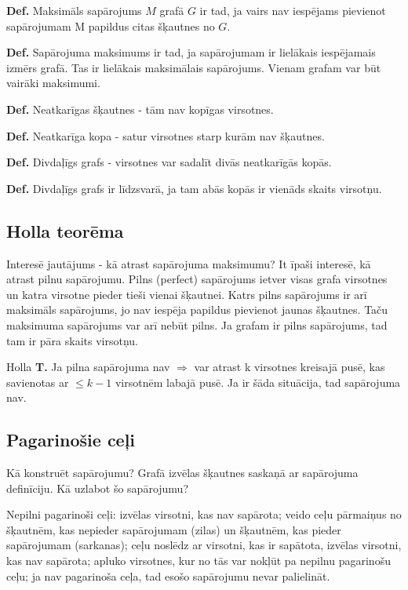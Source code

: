 \documentclass{article}
\begin{document}
\textbf{Def.} Maksimāls sapārojums $M$ grafā $G$ ir tad, ja vairs nav iespējams pievienot sapārojumam M papildus citas šķautnes no $G$.

\textbf{Def.} Sapārojuma maksimums ir tad, ja sapārojumam ir lielākais iespējamais izmērs grafā. Tas ir lielākais maksimālais sapārojums.  Vienam grafam var būt vairāki maksimumi.

\textbf{Def.} Neatkarīgas šķautnes - tām nav kopīgas virsotnes.

\textbf{Def. } Neatkarīga kopa - satur virsotnes starp kurām nav šķautnes.

\textbf{Def.} Divdaļīgs grafs - virsotnes var sadalīt divās neatkarīgās kopās.

\textbf{Def.} Divdaļīgs grafs ir līdzsvarā, ja tam abās kopās ir vienāds skaits virsotņu.

\subsection{Holla teorēma}

Interesē jautājums - kā atrast sapārojuma maksimumu?  It īpaši interesē, kā atrast pilnu sapārojumu.  Pilns (perfect) sapārojums ietver visas grafa virsotnes un katra virsotne pieder tieši vienai šķautnei.  Katrs pilns sapārojums ir arī maksimāls sapārojums, jo nav iespēja papildus pievienot jaunas šķautnes. Taču maksimuma sapārojums var arī nebūt pilns.  Ja grafam ir pilns sapārojums, tad tam ir pāra skaits virsotņu.


Holla \textbf{T. }Ja pilna sapārojuma nav $⇒$ var atrast k virsotnes kreisajā pusē, kas savienotas ar $\le k − 1$ virsotnēm labajā pusē.  Ja ir šāda situācija, tad sapārojuma nav.

\subsection{Pagarinošie ceļi}

Kā konstruēt sapārojumu?  Grafā izvēlas šķautnes saskaņā ar sapārojuma definīciju.  Kā uzlabot šo sapārojumu?

Nepilni pagarinoši ceļi: izvēlas virsotni, kas nav sapārota; veido ceļu pārmaiņus no šķautnēm, kas nepieder sapārojumam (zilas) un šķautnēm, kas pieder sapārojumam (sarkanas); ceļu noslēdz ar virsotni, kas ir sapātota, izvēlas virsotni, kas nav sapārota; apluko virsotnes, kur no tās var nokļūt pa nepilnu pagarinošu ceļu; ja nav pagarinoša ceļa, tad esošo sapārojumu nevar palielināt.
\end{document}
